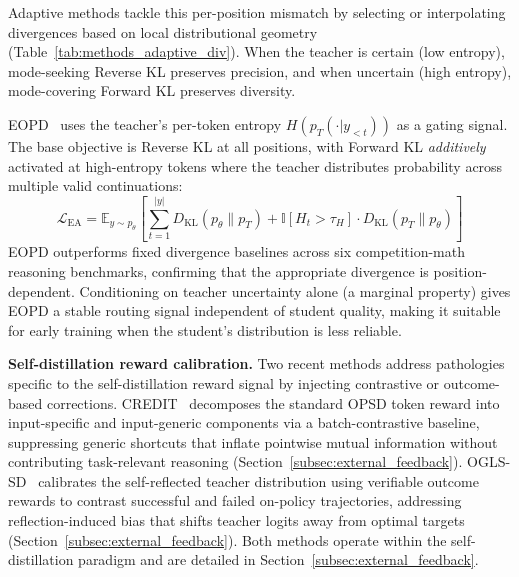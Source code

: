 \documentclass{article} %
\newcommand{\E}{\mathbb{E}}
\newcommand{\KL}{D_{\mathrm{KL}}}
\newcommand{\ptheta}{p_\theta}
\newcommand{\pteacher}{p_T}
\newcommand{\loss}{\mathcal{L}}
\begin{document}
Adaptive methods tackle this per-position mismatch by selecting or interpolating divergences based on local distributional geometry (Table~\ref{tab:methods_adaptive_div}). When the teacher is certain (low entropy), mode-seeking Reverse KL preserves precision, and when uncertain (high entropy), mode-covering Forward KL preserves diversity.

EOPD~\citep{2603.07079} uses the teacher's per-token entropy $H(\pteacher(\cdot|y_{<t}))$ as a gating signal. The base objective is Reverse KL at all positions, with Forward KL \emph{additively} activated at high-entropy tokens where the teacher distributes probability across multiple valid continuations:
\begin{equation*}
    \loss_{\text{EA}} = \E_{y \sim \ptheta} \left[ \sum_{t=1}^{|y|} \KL(\ptheta \parallel \pteacher) + \mathbb{I}[H_t > \tau_H] \cdot \KL(\pteacher \parallel \ptheta) \right]
\end{equation*}
EOPD outperforms fixed divergence baselines across six competition-math reasoning benchmarks, confirming that the appropriate divergence is position-dependent. Conditioning on teacher uncertainty alone (a marginal property) gives EOPD a stable routing signal independent of student quality, making it suitable for early training when the student's distribution is less reliable.

\textbf{Self-distillation reward calibration.} Two recent methods address pathologies specific to the self-distillation reward signal by injecting contrastive or outcome-based corrections. CREDIT~\citep{2605.11613} decomposes the standard OPSD token reward into input-specific and input-generic components via a batch-contrastive baseline, suppressing generic shortcuts that inflate pointwise mutual information without contributing task-relevant reasoning (Section~\ref{subsec:external_feedback}). OGLS-SD~\citep{2605.12400} calibrates the self-reflected teacher distribution using verifiable outcome rewards to contrast successful and failed on-policy trajectories, addressing reflection-induced bias that shifts teacher logits away from optimal targets (Section~\ref{subsec:external_feedback}). Both methods operate within the self-distillation paradigm and are detailed in Section~\ref{subsec:external_feedback}.
\end{document}
